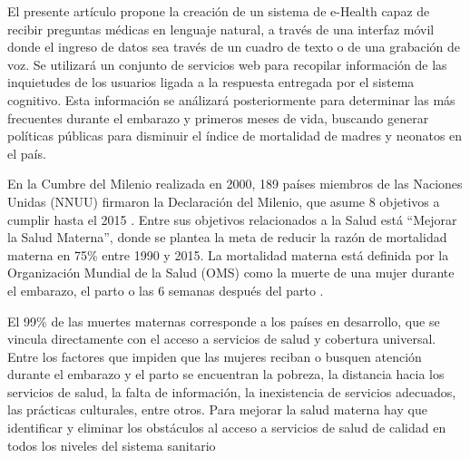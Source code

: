 \documentclass[12pt]{article}
\begin{document}
El presente artículo propone la creación de un sistema de e-Health capaz de recibir preguntas médicas en lenguaje natural, a través de una interfaz móvil donde el ingreso de datos sea través de un cuadro de texto o de una grabación de voz. Se utilizará un conjunto de servicios web para recopilar información de las inquietudes de los usuarios ligada a la respuesta entregada por el sistema cognitivo. Esta información se análizará posteriormente para determinar las más frecuentes durante el embarazo y primeros meses de vida, buscando generar políticas públicas para disminuir el índice de mortalidad de madres y neonatos en el país.

En la Cumbre del Milenio realizada en 2000, 189 países miembros de las Naciones Unidas (NNUU) firmaron la Declaración del Milenio, que asume 8 objetivos a cumplir hasta el 2015 \cite{nnuu2000}. Entre sus objetivos relacionados a la Salud está “Mejorar la Salud Materna”, donde se plantea la meta de reducir la razón de mortalidad materna en 75\% entre 1990 y 2015. La mortalidad materna está definida por la Organización Mundial de la Salud (OMS) como la muerte de una mujer durante el embarazo, el parto o las 6 semanas después del parto \cite{oms2015b}.


El 99\% de las muertes maternas corresponde a los países en desarrollo, que se vincula directamente con el acceso a servicios de salud y cobertura universal. %
Entre los factores que impiden que las mujeres reciban o busquen atención durante el embarazo y el parto se encuentran la pobreza, la distancia hacia los servicios de salud, la falta de información, la inexistencia de servicios adecuados, las prácticas culturales, entre otros. Para mejorar la salud materna hay que identificar y eliminar los obstáculos al acceso a servicios de salud de calidad en todos los niveles del sistema sanitario \cite{oms2015c}
\end{document}
